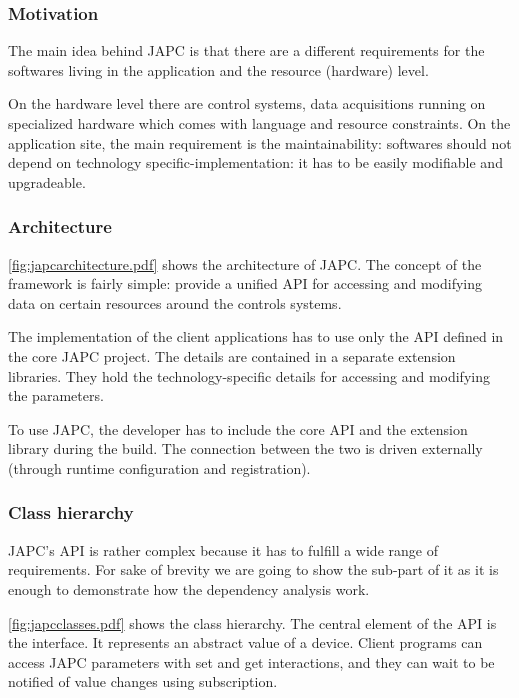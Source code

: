 \subsubsection{Motivation}
The main idea behind JAPC is that there are a different requirements for the 
softwares living in the application and the resource (hardware) level. 

On the hardware level there are control systems, data acquisitions 
running on specialized hardware which comes with language and resource 
constraints. On the application site, the main requirement is the
maintainability: softwares should not depend on technology
specific-implementation: it has to be easily modifiable and upgradeable.

\subsubsection{Architecture}

\autoref{fig:japcarchitecture.pdf} shows the architecture of JAPC. The concept
of the framework is fairly simple: provide a unified API for accessing and
modifying data on certain resources around the controls systems. 

The implementation of the client applications has to use only the API defined
in the core JAPC project. The details are contained in a separate extension
libraries. They hold the  technology-specific details for accessing and
modifying the parameters. 

To use JAPC, the developer has to include the core API and the extension
library during the build. The connection between the two is driven externally (through runtime
configuration and registration).


 \subsubsection{Class hierarchy}
JAPC's API is rather complex because it has to fulfill a wide range of
requirements. For sake of brevity we are going to show the sub-part of it
as it is enough to demonstrate how the dependency analysis work.



\autoref{fig:japcclasses.pdf} shows the class hierarchy.
The central element of the API is the  interface.
It  represents an abstract value of a device.
Client programs can access JAPC parameters with set and get interactions, and
they can wait to be notified of value changes using subscription.

